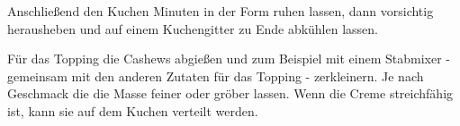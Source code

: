\begin{recipeDP}
{        \step Anschließend den Kuchen  Minuten in der Form ruhen lassen, dann vorsichtig herausheben und auf einem Kuchengitter zu Ende abkühlen lassen.

        \step Für das Topping die Cashews abgießen und zum Beispiel mit einem Stabmixer - gemeinsam mit den anderen Zutaten für das Topping - zerkleinern.
        Je nach Geschmack die die Masse feiner oder gröber lassen.
        Wenn die Creme streichfähig ist, kann sie auf dem Kuchen verteilt werden.
    }



\end{recipeDP}